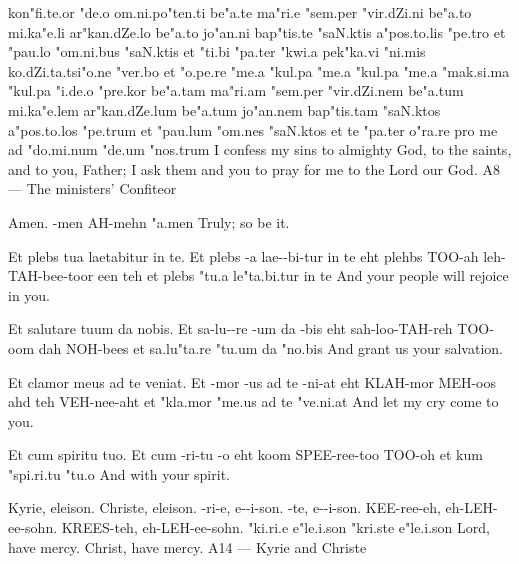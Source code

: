   {kon"fi.te.or "de.o om.ni.po"ten.ti be"a.te ma"ri.e "sem.per "vir.dZi.ni be"a.to mi.ka"e.li ar"kan.dZe.lo be"a.to jo"an.ni bap"tis.te "saN.ktis a"pos.to.lis "pe.tro et "pau.lo "om.ni.bus "saN.ktis et "ti.bi "pa.ter "kwi.a pek"ka.vi "ni.mis ko.dZi.ta.tsi"o.ne "ver.bo et "o.pe.re "me.a "kul.pa "me.a "kul.pa "me.a "mak.si.ma "kul.pa "i.de.o "pre.kor be"a.tam ma"ri.am "sem.per "vir.dZi.nem be"a.tum mi.ka"e.lem ar"kan.dZe.lum be"a.tum jo"an.nem bap"tis.tam "saN.ktos a"pos.to.los "pe.trum et "pau.lum "om.nes "saN.ktos et te "pa.ter o"ra.re pro me ad "do.mi.num "de.um "nos.trum}
  {I confess my sins to almighty God, to the saints, and to you, Father; I ask them and you to pray for me to the Lord our God.}
\expandafter\gdef\csname servertitle@A8\endcsname{A8 --- The ministers' Confiteor}

  {Amen.}
  {-men}
  {AH-mehn}
  {"a.men}
  {Truly; so be it.}

  {Et plebs tua laetabitur in te.}
  {Et plebs -a lae--bi-tur in te}
  {eht plehbs TOO-ah leh-TAH-bee-toor een teh}
  {et plebs "tu.a le"ta.bi.tur in te}
  {And your people will rejoice in you.}

  {Et salutare tuum da nobis.}
  {Et sa-lu--re -um da -bis}
  {eht sah-loo-TAH-reh TOO-oom dah NOH-bees}
  {et sa.lu"ta.re "tu.um da "no.bis}
  {And grant us your salvation.}

  {Et clamor meus ad te veniat.}
  {Et -mor -us ad te -ni-at}
  {eht KLAH-mor MEH-oos ahd teh VEH-nee-aht}
  {et "kla.mor "me.us ad te "ve.ni.at}
  {And let my cry come to you.}

  {Et cum spiritu tuo.}
  {Et cum -ri-tu -o}
  {eht koom SPEE-ree-too TOO-oh}
  {et kum "spi.ri.tu "tu.o}
  {And with your spirit.}

  {Kyrie, eleison. Christe, eleison.}
  {-ri-e, e--i-son. -te, e--i-son.}
  {KEE-ree-eh, eh-LEH-ee-sohn. KREES-teh, eh-LEH-ee-sohn.}
  {"ki.ri.e e"le.i.son "kri.ste e"le.i.son}
  {Lord, have mercy. Christ, have mercy.}
\expandafter\gdef\csname servertitle@A14\endcsname{A14 --- Kyrie and Christe}

